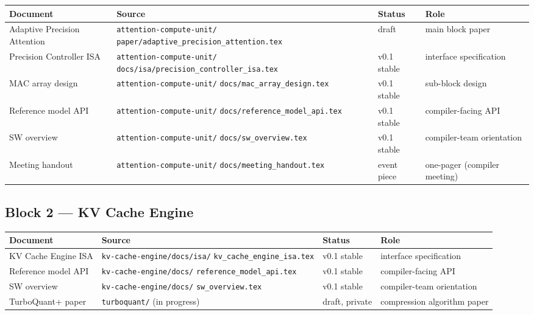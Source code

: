 \documentclass[11pt]{article}
\begin{document}
\begin{center}
\renewcommand{\arraystretch}{1.2}
\setlength{\tabcolsep}{4pt}
\begin{tabular}{@{}p{}p{}lp{}@{}}
\toprule
\textbf{Document} & \textbf{Source} & \textbf{Status} & \textbf{Role} \\
\midrule
Adaptive Precision Attention & \texttt{attention-compute-unit/}
                                \texttt{paper/adaptive\_precision\_attention.tex}
  & draft  & main block paper \\
Precision Controller ISA     & \texttt{attention-compute-unit/}
                                \texttt{docs/isa/precision\_controller\_isa.tex}
  & v0.1 stable & interface specification \\
MAC array design             & \texttt{attention-compute-unit/}
                                \texttt{docs/mac\_array\_design.tex}
  & v0.1 stable & sub-block design \\
Reference model API          & \texttt{attention-compute-unit/}
                                \texttt{docs/reference\_model\_api.tex}
  & v0.1 stable & compiler-facing API \\
SW overview                  & \texttt{attention-compute-unit/}
                                \texttt{docs/sw\_overview.tex}
  & v0.1 stable & compiler-team orientation \\
Meeting handout              & \texttt{attention-compute-unit/}
                                \texttt{docs/meeting\_handout.tex}
  & event piece & one-pager (compiler meeting) \\
\bottomrule
\end{tabular}
\end{center}

\subsection{Block 2 --- KV Cache Engine}

\begin{center}
\renewcommand{\arraystretch}{1.2}
\setlength{\tabcolsep}{4pt}
\begin{tabular}{@{}p{}p{}lp{}@{}}
\toprule
\textbf{Document} & \textbf{Source} & \textbf{Status} & \textbf{Role} \\
\midrule
KV Cache Engine ISA       & \texttt{kv-cache-engine/docs/isa/}
                            \texttt{kv\_cache\_engine\_isa.tex}
  & v0.1 stable & interface specification \\
Reference model API       & \texttt{kv-cache-engine/docs/}
                            \texttt{reference\_model\_api.tex}
  & v0.1 stable & compiler-facing API \\
SW overview               & \texttt{kv-cache-engine/docs/}
                            \texttt{sw\_overview.tex}
  & v0.1 stable & compiler-team orientation \\
TurboQuant+ paper         & \texttt{turboquant/} (in progress)
  & draft, private & compression algorithm paper \\
\bottomrule
\end{tabular}
\end{center}
\end{document}
